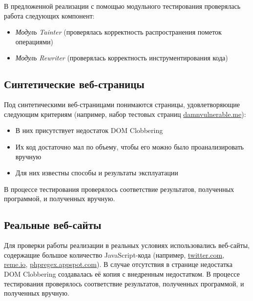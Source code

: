 	В предложенной реализации с помощью модульного тестирования проверялась работа следующих компонент:
	\begin{itemize}
		\item \textit{Модуль Tainter} (проверялась корректность распространения пометок операциями)
		\item \textit{Модуль Rewriter} (проверялась корректность инструментирования кода)
	\end{itemize}

\subsection{Синтетические веб-страницы}
	Под синтетическими веб-страницами понимаются страницы, удовлетворяющие следующим критериям (например, набор тестовых страниц  \url{damnvulnerable.me}): 

	\begin{itemize}
		\item В них присутствует недостаток DOM Clobbering
		\item Их код достаточно мал по объему, чтобы его можно было проанализировать вручную
		\item Для них известны способы и результаты эксплуатации
	\end{itemize}


	В процессе тестирования проверялось соответствие результатов, полученных программой, и полученных вручную.

\subsection{Реальные веб-сайты}
	Для проверки работы реализации в реальных условиях использовались веб-сайты, содержащие большое количество JavaScript-кода (например, \url{twitter.com}, \url{reme.io}, \url{phpregex.appspot.com}). В случае отсутствия в странице недостатка DOM Clobbering создавалась её копия с внедренным недостатком. В процессе тестирования проверялось соответствие результатов, полученных программой, и полученных вручную.


